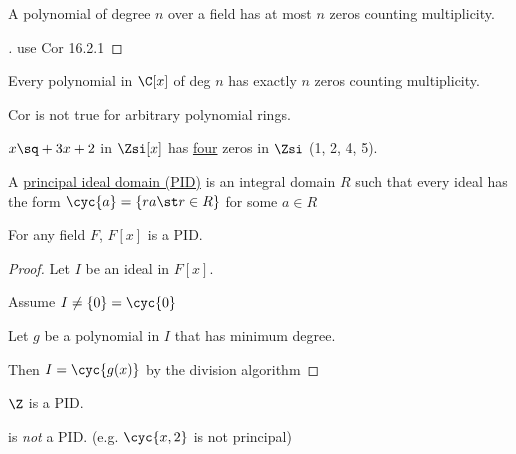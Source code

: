 \documentclass[a4paper]{article}
\begin{document}
\begin{corollary}
  A polynomial of degree \( n \) over a field has at most \( n \) zeros counting multiplicity.
\end{corollary}

\begin{proof}[]
  use Cor 16.2.1
\end{proof}

\begin{example}
  Every polynomial in \( \C[x] \) of deg \( n \) has exactly \( n \) zeros counting multiplicity.
\end{example}

Cor is not true for arbitrary polynomial rings.

\begin{example}
  \( x\sq+3x+2 \) in \( \Zsi[x] \) has \ul{four} zeros in \( \Zsi \) (1, 2, 4, 5).
\end{example}

\begin{definition}
  A \ul{principal ideal domain (PID)} is an integral domain \( R \) such that every ideal has the form \( \cyc{a}=\{ra\st r\in R\} \) for some \( a\in R \)
\end{definition}

\begin{theorem}
  For any field \( F \), \( F[x] \) is a PID.
\end{theorem}

\begin{proof}
  Let \( I \) be an ideal in \( F[x] \).

  Assume \( I\neq \{0\}=\cyc{0} \)

  Let \( g \) be a polynomial in \( I \) that has minimum degree.

  Then \( I=\cyc{g(x)} \) by the division algorithm
\end{proof}

\begin{theorem}
  \( \Z \) is a PID.
\end{theorem}

\begin{example}
  \Z[x] is \emph{not} a PID. (e.g. \( \cyc{x,2} \) is not principal)
\end{example}
\end{document}
